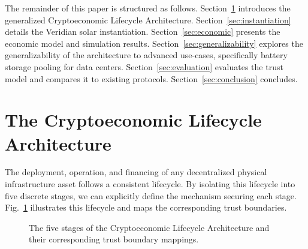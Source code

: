 \documentclass[conference]{IEEEtran}
\begin{document}
The remainder of this paper is structured as follows. Section~\ref{sec:architecture} introduces the generalized Cryptoeconomic Lifecycle Architecture. Section~\ref{sec:instantiation} details the Veridian solar instantiation. Section~\ref{sec:economic} presents the economic model and simulation results. Section~\ref{sec:generalizability} explores the generalizability of the architecture to advanced use-cases, specifically battery storage pooling for data centers. Section~\ref{sec:evaluation} evaluates the trust model and compares it to existing protocols. Section~\ref{sec:conclusion} concludes.

\section{The Cryptoeconomic Lifecycle Architecture}
\label{sec:architecture}

The deployment, operation, and financing of any decentralized physical infrastructure asset follows a consistent lifecycle. By isolating this lifecycle into five discrete stages, we can explicitly define the mechanism securing each stage. Fig.~\ref{fig:architecture} illustrates this lifecycle and maps the corresponding trust boundaries.

\begin{figure}[t]
\centering
{}
\caption{The five stages of the Cryptoeconomic Lifecycle Architecture and their corresponding trust boundary mappings.}
\label{fig:architecture}
\end{figure}
\end{document}
